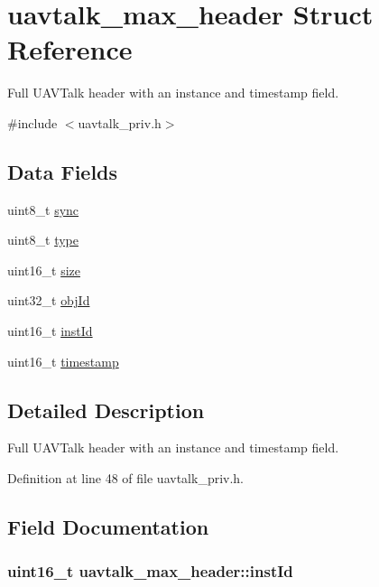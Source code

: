 \hypertarget{structuavtalk__max__header}{\section{uavtalk\-\_\-max\-\_\-header \-Struct \-Reference}
\label{structuavtalk__max__header}
}


\-Full \-U\-A\-V\-Talk header with an instance and timestamp field.  




{\ttfamily \#include $<$uavtalk\-\_\-priv.\-h$>$}

\subsection*{\-Data \-Fields}
\begin{DoxyCompactItemize}
\item 
uint8\-\_\-t \hyperlink{structuavtalk__max__header_a345956ffa399c59404b4e1523001759a}{sync}
\item 
uint8\-\_\-t \hyperlink{structuavtalk__max__header_a5b36790b1ee1944fe8d335b817e5f424}{type}
\item 
uint16\-\_\-t \hyperlink{structuavtalk__max__header_a8c446383de21042da34e0f6e2900772a}{size}
\item 
uint32\-\_\-t \hyperlink{structuavtalk__max__header_ae86ac377823746b4ec927b0bf9d7d79b}{obj\-Id}
\item 
uint16\-\_\-t \hyperlink{structuavtalk__max__header_a01123d41274c0fb4858bc676a7a6bccb}{inst\-Id}
\item 
uint16\-\_\-t \hyperlink{structuavtalk__max__header_a9dcfa0653337ea23ff5de9ba704d8db7}{timestamp}
\end{DoxyCompactItemize}


\subsection{\-Detailed \-Description}
\-Full \-U\-A\-V\-Talk header with an instance and timestamp field. 

\-Definition at line 48 of file uavtalk\-\_\-priv.\-h.



\subsection{\-Field \-Documentation}
\hypertarget{structuavtalk__max__header_a01123d41274c0fb4858bc676a7a6bccb}{
\subsubsection[{inst\-Id}]{\setlength{\rightskip}{0pt plus 5cm}uint16\-\_\-t {\bf uavtalk\-\_\-max\-\_\-header\-::inst\-Id}}}\label{structuavtalk__max__header_a01123d41274c0fb4858bc676a7a6bccb}


